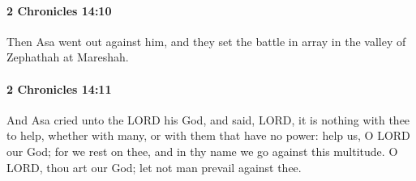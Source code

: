 		\paragraph{2 Chronicles 14:10} %
			\label{2CHRONICLES-14-10}

			Then Asa went out against him, and they set the battle in array in the valley of Zephathah at Mareshah.


		\paragraph{2 Chronicles 14:11} %
			\label{2CHRONICLES-14-11}

			And Asa cried unto the LORD his God, and said, LORD, it is nothing with thee to help, whether with many, or with them that have no power: help us, O LORD our God; for we rest on thee, and in thy name we go against this multitude. O LORD, thou art our God; let not man prevail against thee.

